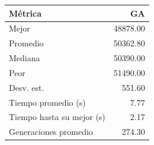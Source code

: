 \begin{tabular}{lr}
\toprule
Métrica & GA \\
\midrule
Mejor & 48878.00 \\
Promedio & 50362.80 \\
Mediana & 50390.00 \\
Peor & 51490.00 \\
Desv. est. & 551.60 \\
Tiempo promedio (s) & 7.77 \\
Tiempo hasta su mejor (s) & 2.17 \\
Generaciones promedio & 274.30 \\
\bottomrule
\end{tabular}
